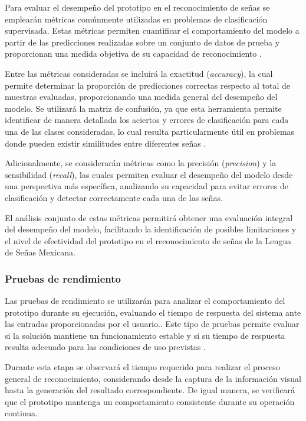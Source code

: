 	Para evaluar el desempeño del prototipo en el reconocimiento de señas se
	emplearán métricas comúnmente utilizadas en problemas de clasificación
	supervisada. Estas métricas permiten cuantificar el comportamiento del modelo
	a partir de las predicciones realizadas sobre un conjunto de datos de prueba
	y proporcionan una medida objetiva de su capacidad de reconocimiento
	\cite{bishop2006,geron2019}.
	
	Entre las métricas consideradas se incluirá la exactitud (\textit{accuracy}),
	la cual permite determinar la proporción de predicciones correctas respecto al
	total de muestras evaluadas, proporcionando una medida general del desempeño
	del modelo. Se utilizará la matriz de confusión, ya que esta
	herramienta permite identificar de manera detallada los aciertos y errores de
	clasificación para cada una de las clases consideradas, lo cual resulta
	particularmente útil en problemas donde pueden existir similitudes entre
	diferentes señas \cite{geron2019,goodfellow2016}.
	
	Adicionalmente, se considerarán métricas como la precisión (\textit{precision})
	y la sensibilidad (\textit{recall}), las cuales permiten evaluar el desempeño
	del modelo desde una perspectiva más específica, analizando su capacidad para
	evitar errores de clasificación y detectar correctamente cada una de las
	señas.
	
	El análisis conjunto de estas métricas permitirá obtener una evaluación
	integral del desempeño del modelo, facilitando la identificación de posibles
	limitaciones y el nivel de efectividad del prototipo en el reconocimiento de
	señas de la Lengua de Señas Mexicana.
	
	
	\subsubsection{Pruebas de rendimiento}
	
	Las pruebas de rendimiento se utilizarán para analizar el comportamiento del
	prototipo durante su ejecución, evaluando el tiempo de respuesta del sistema
	ante las entradas proporcionadas por el usuario.. Este tipo de pruebas permite
	evaluar si la solución mantiene un funcionamiento estable y si su tiempo de
	respuesta resulta adecuado para las condiciones de uso previstas
	\cite{pressman2014,sommerville2016}.
	
	Durante esta etapa se observará el tiempo requerido para realizar el proceso
	general de reconocimiento, considerando desde la captura de la información
	visual hasta la generación del resultado correspondiente. De igual manera, se
	verificará que el prototipo mantenga un comportamiento consistente durante su
	operación continua.
	
